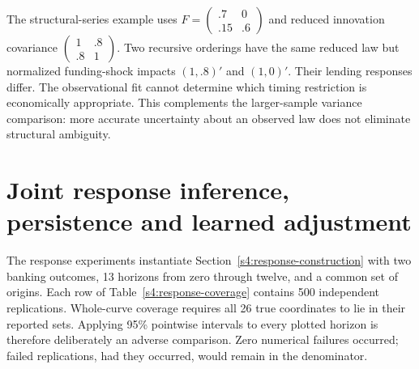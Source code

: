 The structural-series example uses
$F=\left(\begin{smallmatrix}.7&0\\.15&.6\end{smallmatrix}\right)$
and reduced innovation covariance
$\left(\begin{smallmatrix}1&.8\\.8&1\end{smallmatrix}\right)$.
Two recursive orderings have the same reduced law but normalized
funding-shock impacts $(1,.8)'$ and $(1,0)'$. Their lending responses
differ. The observational fit cannot determine which timing restriction
is economically appropriate. This complements the larger-sample
variance comparison: more accurate uncertainty about an observed law
does not eliminate structural ambiguity.



\section{Joint response inference, persistence and learned adjustment}
\label{s4:response-results}
The response experiments instantiate Section~\ref{s4:response-construction}
with two banking outcomes, 13 horizons from zero through twelve, and a
common set of origins. Each row of Table~\ref{s4:response-coverage} contains
500 independent replications. Whole-curve coverage requires all 26 true
coordinates to lie in their reported sets. Applying 95\% pointwise intervals
to every plotted horizon is therefore deliberately an adverse comparison.
Zero numerical failures occurred; failed replications, had they occurred,
would remain in the denominator.

